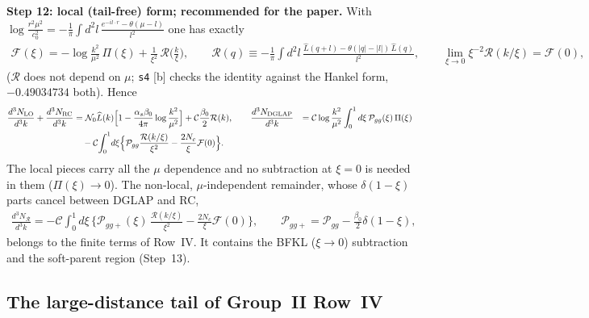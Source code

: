 \medskip
\noindent\textbf{Step 12: local (tail-free) form; recommended for the paper.} With $\log\frac{r^{2}\mu^{2}}{c_{0}^{2}}=-\frac{1}{\pi}\int d^{2}l\,\frac{e^{-il\cdot r}-\theta(\mu-l)}{l^{2}}$ one has exactly
\begin{align}
\mathcal{F}(\xi)=-\log\frac{k^{2}}{\mu^{2}}\,\Pi(\xi)+\frac{1}{\xi^{2}}\,\mathcal{R}\Big(\frac{k}{\xi}\Big),\qquad
\mathcal{R}(q)\equiv-\frac{1}{\pi}\int d^{2}l\,\frac{\widehat{L}(q+l)-\theta(|q|-|l|)\,\widehat{L}(q)}{l^{2}},\qquad\lim_{\xi\to0}\xi^{-2}\mathcal{R}(k/\xi)=\mathcal{F}(0),
\label{eq:pd-loc}
\end{align}
($\mathcal{R}$ does not depend on $\mu$; \texttt{s4} [b] checks the identity against the Hankel form, $-0.49034734$ both). Hence
\begin{align}
\frac{d^{3}N_{\rm LO}}{d^{3}k}+\frac{d^{3}N_{\rm RC}}{d^{3}k}&=\mathcal{N}_{0}\widehat{L}(k)\Big[1-\frac{\alpha_{s}\beta_{0}}{4\pi}\log\frac{k^{2}}{\mu^{2}}\Big]+\mathcal{C}\frac{\beta_{0}}{2}\mathcal{R}(k),\qquad
\frac{d^{3}N_{\rm DGLAP}}{d^{3}k}&=\mathcal{C}\log\frac{k^{2}}{\mu^{2}}\int_{0}^{1}d\xi\,\mathcal{P}_{gg}(\xi)\,\Pi(\xi)\notag\\&\quad-\mathcal{C}\!\int_{0}^{1}\!d\xi\Big\{\mathcal{P}_{gg}\frac{\mathcal{R}(k/\xi)}{\xi^{2}}-\frac{2N_{c}}{\xi}\mathcal{F}(0)\Big\}.
\notag
\end{align}
The local pieces carry all the $\mu$ dependence and no subtraction at $\xi=0$ is needed in them ($\Pi(\xi)\to0$). The non-local, $\mu$-independent remainder, whose $\delta(1-\xi)$ parts cancel between DGLAP and RC,
\begin{align}
\frac{d^{3}N_{\mathcal{R}}}{d^{3}k}=-\mathcal{C}\int_{0}^{1}d\xi\,\Big\{\mathcal{P}_{gg+}(\xi)\,\frac{\mathcal{R}(k/\xi)}{\xi^{2}}-\frac{2N_{c}}{\xi}\mathcal{F}(0)\Big\},\qquad\mathcal{P}_{gg+}=\mathcal{P}_{gg}-\frac{\beta_{0}}{2}\delta(1-\xi),
\label{eq:pd-R}
\end{align}
belongs to the finite terms of Row~IV. It contains the BFKL ($\xi\to0$) subtraction and the soft-parent region (Step~13).

\subsection{The large-distance tail of Group~II Row~IV}

